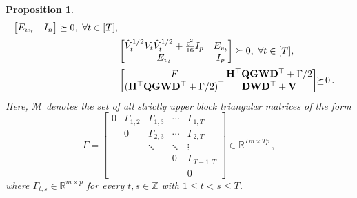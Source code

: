 \documentclass[letterpaper, 10 pt, conference]{ieeeconf}  %
\theoremstyle{ieeeconf}
\newtheorem{proposition}{Proposition}
\begin{document}
\begin{proposition}
\begin{align*}
\begin{bmatrix}
E_{w_t} & I_n
\end{bmatrix} \succeq 0,\ \forall t \in [T],
\\[1pt]
& 
\begin{bmatrix}
\hat{V}_t^{1/2} V_t \hat{V}_t^{1/2}  +\frac{\epsilon^2}{16}I_p& E_{v_t} \\
E_{v_t} & I_p
\end{bmatrix} \succeq 0, 
\ \forall t \in [T],
\\[1pt]
& 
\setlength\arraycolsep{.9pt}
\begin{bmatrix}
F & \mathbf{H^{\top} Q G W D^{\top}} + \Gamma/2
\\[1pt]
(\mathbf{H^{\top} Q G W D^{\top}} + \Gamma/2)^{\top} & \mathbf{D W D^{\top} + V}
\end{bmatrix}
\!\!\succeq\! 0\,.
\end{align*}
\noindent
Here, $\mathcal{M}$ denotes the set of all strictly upper block triangular matrices of the form
\[
\Gamma = \begin{bmatrix}
0 & \Gamma_{1,2} & \Gamma_{1,3} & \cdots & \Gamma_{1,T} \\
 & 0 & \Gamma_{2,3} & \cdots & \Gamma_{2,T} \\
 &  & \ddots & \ddots & \vdots \\
&  &  & 0 & \Gamma_{T-1,T} \\
 & &&& 0
\end{bmatrix}
\in \mathbb{R}^{Tm \times Tp}\,,
\]
where $\Gamma_{t,s} \in \mathbb{R}^{m \times p}$ for every $t,s \in \mathbb{Z}$ with $1 \le t < s \le T$.
\end{proposition}
\end{document}
